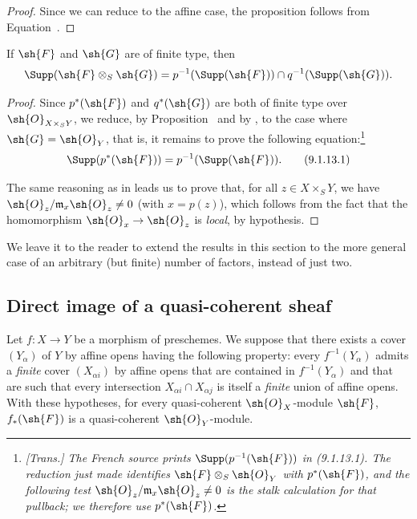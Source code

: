 \begin{proof}
Since we can reduce to the affine case, the proposition follows from
Equation~.
\end{proof}

\begin{corollary}[9.1.13]
\label{I.9.1.13}
If $\sh{F}$ and $\sh{G}$ are of finite type, then
\[
  \Supp(\sh{F}\otimes_S\sh{G})=p^{-1}(\Supp(\sh{F}))\cap q^{-1}(\Supp(\sh{G})).
\]
\end{corollary}

\begin{proof}
Since $p^*(\sh{F})$ and $q^*(\sh{G})$ are both of finite type over
$\sh{O}_{X\times_S Y}$, we reduce, by Proposition~ and
by , to the case where $\sh{G}=\sh{O}_Y$, that
is, it remains to prove the following equation:\footnote{\emph{[Trans.] The
French source prints $\Supp(p^{-1}(\sh{F}))$ in (9.1.13.1). The reduction
just made identifies $\sh{F}\otimes_S\sh{O}_Y$ with $p^*(\sh{F})$, and the
following test $\sh{O}_z/\mathfrak{m}_x\sh{O}_z\neq0$ is the stalk
calculation for that pullback; we therefore use $p^*(\sh{F})$.}}
\[
\label{I.9.1.13.1}
  \Supp(p^*(\sh{F}))=p^{-1}(\Supp(\sh{F})).
  \tag{9.1.13.1}
\]

The same reasoning as in  leads us to prove that, for all
$z\in X\times_S Y$, we have $\sh{O}_z/\mathfrak{m}_x\sh{O}_z\neq0$ (with $x=p(z)$),
which follows from the fact that the homomorphism $\sh{O}_x\to\sh{O}_z$ is \emph{local},
by hypothesis.
\end{proof}

We leave it to the reader to extend the results in this section to the more
general case of an arbitrary (but finite) number of factors, instead of just two.

\subsection{Direct image of a quasi-coherent sheaf}
\label{subsection:I.9.2}

\begin{proposition}[9.2.1]
\label{I.9.2.1}
Let $f:X\to Y$ be a morphism of
preschemes. We suppose that there exists a cover $(Y_\alpha)$ of $Y$ by affine
opens having the following property: every $f^{-1}(Y_\alpha)$ admits a
\emph{finite} cover $(X_{\alpha i})$ by affine opens that are contained in
$f^{-1}(Y_\alpha)$ and that are such that every intersection $X_{\alpha i}\cap X_{\alpha j}$
is itself a \emph{finite} union of affine opens. With these hypotheses, for
every quasi-coherent $\sh{O}_X$-module $\sh{F}$, $f_*(\sh{F})$ is a
quasi-coherent $\sh{O}_Y$-module.
\end{proposition}

